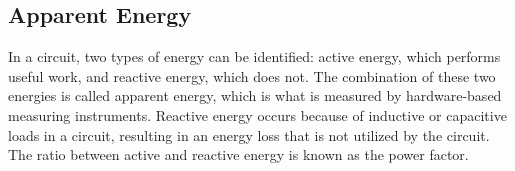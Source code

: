 \subsection{Apparent Energy}

In a circuit, two types of energy can be identified: active energy, which performs useful work, and reactive energy, which does not. The combination of these two energies is called apparent energy, which is what is measured by hardware-based measuring instruments. Reactive energy occurs because of inductive or capacitive loads in a circuit, resulting in an energy loss that is not utilized by the circuit\cite{ReactP}. The ratio between active and reactive energy is known as the power factor\cite{ReactP}.
